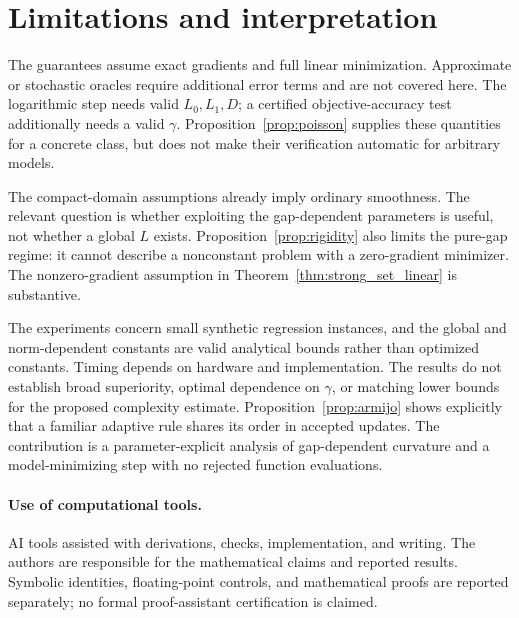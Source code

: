 \section{Limitations and interpretation}
The guarantees assume exact gradients and full linear minimization.
Approximate or stochastic oracles require additional error terms and are
not covered here. The logarithmic step needs valid $L_0,L_1,D$; a certified
objective-accuracy test additionally needs a valid $\gamma$.
Proposition~\ref{prop:poisson} supplies these quantities for a concrete
class, but does not make their verification automatic for arbitrary models.

The compact-domain assumptions already imply ordinary smoothness.
The relevant question is whether exploiting the gap-dependent parameters
is useful, not whether a global $L$ exists. Proposition~\ref{prop:rigidity}
also limits the pure-gap regime: it cannot describe a nonconstant problem
with a zero-gradient minimizer. The nonzero-gradient assumption in
Theorem~\ref{thm:strong_set_linear} is substantive.

The experiments concern small synthetic regression instances, and the
global and norm-dependent constants are valid analytical bounds rather
than optimized constants. Timing depends on hardware and implementation.
The results do not establish broad superiority, optimal dependence on
$\gamma$, or matching lower bounds for the proposed complexity estimate.
Proposition~\ref{prop:armijo} shows explicitly that a familiar adaptive
rule shares its order in accepted updates. The contribution is a
parameter-explicit analysis of gap-dependent curvature and a model-minimizing
step with no rejected function evaluations.

\paragraph{Use of computational tools.}
AI tools assisted with derivations, checks, implementation, and writing.
The authors are responsible for the mathematical claims and reported results.
Symbolic identities, floating-point controls, and mathematical proofs are
reported separately; no formal proof-assistant certification is claimed.
